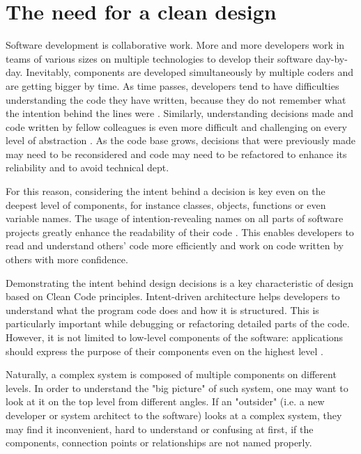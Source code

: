 \documentclass[conference]{IEEEtran}
\begin{document}
\section{The need for a clean design}
Software development is collaborative work. More and more developers work in teams of various sizes on multiple technologies to develop their software day-by-day. Inevitably, components are developed simultaneously by multiple coders and are getting bigger by time. As time passes, developers tend to have difficulties understanding the code they have written, because they do not remember what the intention behind the lines were \cite{cleancoder}. Similarly, understanding decisions made and code written by fellow colleagues is even more difficult and challenging on every level of abstraction \cite{cleancoder}. As the code base grows, decisions that were previously made may need to be reconsidered and code may need to be refactored to enhance its reliability and to avoid technical dept. 

For this reason, considering the intent behind a decision is key even on the deepest level of components, for instance classes, objects, functions or even variable names. The usage of intention-revealing names on all parts of software projects greatly enhance the readability of their code \cite{cleancode}. This enables developers to read and understand others' code more efficiently and work on code written by others with more confidence. 

Demonstrating the intent behind design decisions is a key characteristic of design based on Clean Code principles. Intent-driven architecture helps developers to understand what the program code does and how it is structured. This is particularly important while debugging or refactoring detailed parts of the code. However, it is not limited to low-level components of the software: applications should express the purpose of their components even on the highest level \cite{cleanarchitecture}. 

Naturally, a complex system is composed of multiple components on different levels. In order to understand the "big picture" of such system, one may want to look at it on the top level from different angles. If an "outsider" (i.e. a new developer or system architect to the software) looks at a complex system, they may find it inconvenient, hard to understand or confusing at first, if the components, connection points or relationships are not named properly.
\end{document}
